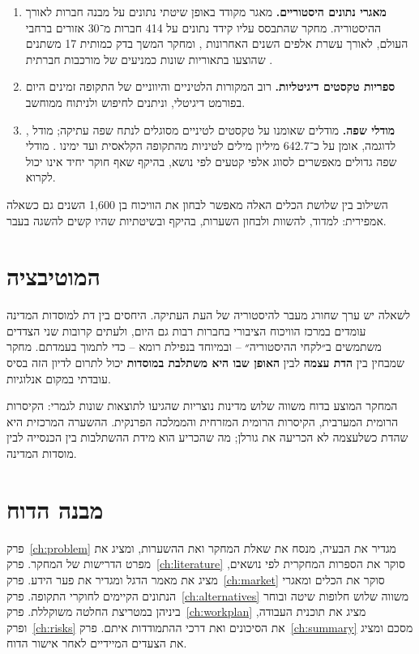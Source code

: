 \begin{enumerate}
  \item \textbf{מאגרי נתונים היסטוריים.} מאגר  מקודד באופן שיטתי נתונים על מבנה חברות לאורך ההיסטוריה. מחקר שהתבסס עליו קידד נתונים על 414 חברות מ־30 אזורים ברחבי העולם, לאורך עשרת אלפים השנים האחרונות \cite{turchin2018quantitative}, ומחקר המשך בדק כמותית 17 משתנים שהוצעו בתאוריות שונות כמניעים של מורכבות חברתית \cite{turchin2022disentangling}.
  \item \textbf{ספריות טקסטים דיגיטליות.} רוב המקורות הלטיניים והיווניים של התקופה זמינים היום בפורמט דיגיטלי, וניתנים לחיפוש ולניתוח ממוחשב.
  \item \textbf{מודלי שפה.} מודלים שאומנו על טקסטים לטיניים מסוגלים לנתח שפה עתיקה; מודל , לדוגמה, אומן על כ־642.7 מיליון מילים לטיניות מהתקופה הקלאסית ועד ימינו \cite{bamman2020latinbert}. מודלי שפה גדולים מאפשרים לסווג אלפי קטעים לפי נושא, בהיקף שאף חוקר יחיד אינו יכול לקרוא.
\end{enumerate}

השילוב בין שלושת הכלים האלה מאפשר לבחון את הוויכוח בן 1,600 השנים גם כשאלה אמפירית: למדוד, להשוות ולבחון השערות, בהיקף ובשיטתיות שהיו קשים להשגה בעבר.

\section{המוטיבציה}
\label{sec:intro-motivation}

לשאלה יש ערך שחורג מעבר להיסטוריה של העת העתיקה. היחסים בין דת למוסדות המדינה עומדים במרכז הוויכוח הציבורי בחברות רבות גם היום, ולעתים קרובות שני הצדדים משתמשים ב״לקחי ההיסטוריה״ – ובמיוחד בנפילת רומא – כדי לתמוך בעמדתם. מחקר שמבחין בין \textbf{הדת עצמה} לבין \textbf{האופן שבו היא משתלבת במוסדות} יכול לתרום לדיון הזה בסיס עובדתי במקום אנלוגיות.

המחקר המוצע בדוח משווה שלוש מדינות נוצריות שהגיעו לתוצאות שונות לגמרי: הקיסרות הרומית המערבית, הקיסרות הרומית המזרחית והממלכה הפרנקית. ההשערה המרכזית היא שהדת כשלעצמה לא הכריעה את גורלן; מה שהכריע הוא מידת ההשתלבות בין הכנסייה לבין מוסדות המדינה.

\section{מבנה הדוח}
\label{sec:intro-structure}

פרק~\ref{ch:problem} מגדיר את הבעיה, מנסח את שאלת המחקר ואת ההשערות, ומציג את מפרט הדרישות של המחקר. פרק~\ref{ch:literature} סוקר את הספרות המחקרית לפי נושאים, מציג את מאמר הדגל ומגדיר את פער הידע. פרק~\ref{ch:market} סוקר את הכלים ומאגרי הנתונים הקיימים לחוקרי התקופה. פרק~\ref{ch:alternatives} משווה שלוש חלופות שיטה ובוחר ביניהן במטריצת החלטה משוקללת. פרק~\ref{ch:workplan} מציג את תוכנית העבודה, ופרק~\ref{ch:risks} את הסיכונים ואת דרכי ההתמודדות איתם. פרק~\ref{ch:summary} מסכם ומציג את הצעדים המיידיים לאחר אישור הדוח.
